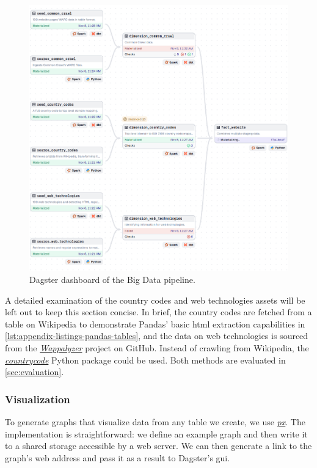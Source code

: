 \begin{figure}[H]
  \centering
  \includegraphics[width=\textwidth]{figures/dagster-white-ui-cut.png}
  \caption{Dagster dashboard of the Big Data pipeline.}
  \label{fig:implementation-dx-dashboard}
\end{figure}

A detailed examination of the country codes and web technologies assets will be left out to keep this section concise.
In brief, the country codes are fetched from a table on Wikipedia to demonstrate Pandas' basic \ac{html} extraction capabilities in \cref{lst:appendix-listings-pandas-tables}, and the data on web technologies is sourced from the \href{https://github.com/tunetheweb/wappalyzer/}{\textit{Wappalyzer}} project on GitHub.
Instead of crawling from Wikipedia, the \href{https://pypi.org/project/countrycode/}{\textit{countrycode}} Python package could be used.
Both methods are evaluated in \cref{sec:evaluation}.


\subsubsection{Visualization}
\label{sec:implementation-pipeline-visualization}

To generate graphs that visualize data from any table we create, we use \href{https://plotly.com/}{\textit{\ac{px}}}.
The implementation is straightforward: we define an example graph and then write it to a shared storage accessible by a web server.
We can then generate a link to the graph's web address and pass it as a result to Dagster's \ac{gui}.

